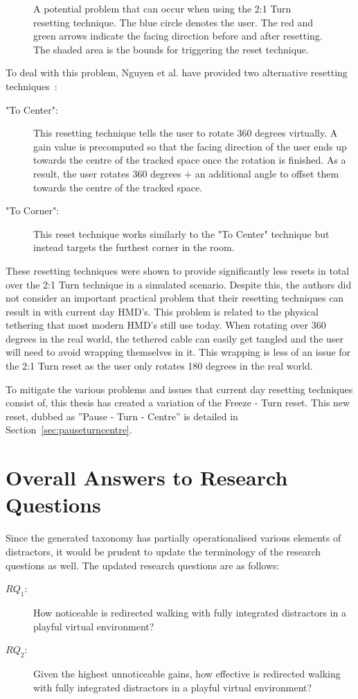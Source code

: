 \begin{figure}[htbp]
  \centering
  
  \caption[Potential Problem With 2:1 Turn Resetting]{A potential problem that can occur when using the 2:1 Turn resetting technique. The blue circle denotes the user. The red and green arrows indicate the facing direction before and after resetting. The shaded area is the bounds for triggering the reset technique.}
  \label{fig:2to1turnProblem}
\end{figure}

To deal with this problem, Nguyen et al. have provided two alternative resetting techniques~\cite{nguyen2018discrete}:

\begin{description}
   \item["To Center": ] This resetting technique tells the user to rotate 360 degrees virtually. A gain value is precomputed so that the facing direction of the user ends up towards the centre of the tracked space once the rotation is finished. As a result, the user rotates 360 degrees + an additional angle to offset them towards the centre of the tracked space.
   \item["To Corner": ] This reset technique works similarly to the "To Center" technique but instead targets the furthest corner in the room. 
\end{description}

These resetting techniques were shown to provide significantly less resets in total over the 2:1 Turn technique in a simulated scenario. Despite this, the authors did not consider an important practical problem that their resetting techniques can result in with current day HMD's. This problem is related to the physical tethering that most modern HMD's still use today. When rotating over 360 degrees in the real world, the tethered cable can easily get tangled and the user will need to avoid wrapping themselves in it. This wrapping is less of an issue for the 2:1 Turn reset as the user only rotates 180 degrees in the real world. 

To mitigate the various problems and issues that current day resetting techniques consist of, this thesis has created a variation of the Freeze - Turn reset. This new reset, dubbed as ''Pause - Turn - Centre'' is detailed in Section~\ref{sec:pauseturncentre}.

\section{Overall Answers to Research Questions}
Since the generated taxonomy has partially operationalised various elements of distractors, it would be prudent to update the terminology of the research questions as well. 
The updated research questions are as follows: 
\begin{description}
   \item[$RQ_1$: ] How noticeable is redirected walking with fully integrated distractors in a playful virtual environment?
   \item[$RQ_2$: ] Given the highest unnoticeable gains, how effective is redirected walking with fully integrated distractors in a playful virtual environment?
\end{description}


